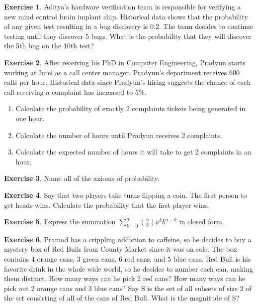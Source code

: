 \documentclass[12pt]{amsart}
\theoremstyle{definition}
\newtheorem{exercise}{Exercise}
\numberwithin{equation}{section}
\theoremstyle{plain}
\begin{document}
\begin{exercise}
    Aditya's hardware verification team is responsible for verifying a new mind control brain implant chip. Historical data shows that the probability of any given test resulting in a bug discovery is 0.2. The team decides to continue testing until they discover 5 bugs. What is the probability that they will discover the 5th bug on the 10th test?%
\end{exercise}

\begin{exercise}
    After receiving his PhD in Computer Engineering, Pradyun starts working at Intel as a call center manager. Pradyun's department receives 600 calls per hour. Historical data since Pradyun's hiring suggests the chance of each call receiving a complaint has increased to 5\%. 
    \begin{enumerate}
    \item Calculate the probability of exactly 2 complaints tickets being generated in one hour. 
    \item Calculate the number of hours until Pradyun receives 2 complaints.
    \item Calculate the expected number of hours it will take to get 2 complaints in an hour.
    \end{enumerate}
\end{exercise}

\begin{exercise}
Name all of the axioms of probability.
\end{exercise}

\begin{exercise}
Say that two players take turns flipping a coin. The first person to get heads wins. Calculate the probability that the first player wins.
\end{exercise}

\begin{exercise}
Express the summation $\sum_{k=0}^{n}\binom{n}{k}a^kb^{n-k}$ in closed form.
\end{exercise}

\begin{exercise}
Pramod has a crippling addiction to caffeine, so he decides to buy a mystery box of Red Bulls from County Market since it was on sale. The box contains 4 orange cans, 3 green cans, 6 red cans, and 5 blue cans. Red Bull is his favorite drink in the whole wide world, so he decides to number each can, making them distinct. 
\newline
How many ways can he pick 2 red cans?
\newline
How many ways can he pick out 2 orange cans and 3 blue cans?
\newline
Say S is the set of all subsets of size 2 of the set consisting of all of the cans of Red Bull. What is the magnitude of S?
\end{exercise}
\end{document}
